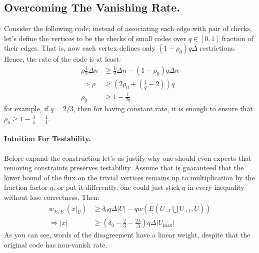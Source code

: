 \subsection { Overcoming The Vanishing Rate. } 
Consider the following code; instead of associating each edge with pair of checks, let's define the vertices to be the checks of small codes over $q \in [0,1]$ fraction of their edges. That is, now each vertex defines only $\left( 1 - \rho_{0} \right)q\Delta$ restrictions. Hence, the rate of the code is at least:   
\begin{equation*}
  \begin{split}
    \rho\frac{1}{2}\Delta n & \ge \frac{1}{2}\Delta n - \left(1 - \rho_{0} \right)q\Delta n \\
    \Rightarrow \rho & \ge \left(  2\rho_{0} + \left( \frac{1}{q}  - 2  \right)  \right)q \\ 
    \rho_{0} & \ge  1 - \frac{1}{2q} 
  \end{split}
\end{equation*} for example, if $q = 2/3$, then for having constant rate, it is enough to ensure that $ \rho_{0} \ge 1 - \frac{3}{4} = \frac{1}{4}$.

\paragraph{Intuition For Testability.} Before expand the construction let's us justify why one should even expects that removing constraints preserves testability. Assume that is guaranteed that the lower bound of the flux on the trivial vertices remains up to multiplication by the fraction factor $q$, or put it differently, one could just stick $q$ in every inequality without lose correctness, Then: 
\begin{equation*}
  \begin{split}
    w_{E/E^{\prime}}\left( x|_{U} \right) & \ge  \delta_{0}q\Delta|U| -qw\left( E(U_{-1} \bigcup U_{+1} ,U)  \right) \\ 
    \Rightarrow |x| & \ge \left(  \delta_{0} - \frac{2}{3} - \frac{2\lambda}{\Delta} \right) q \Delta|U_{\max}|
  \end{split}
\end{equation*}
As you can see, \ireducable words of the disagreement have a linear weight, despite that the original code has non-vanish rate.     

